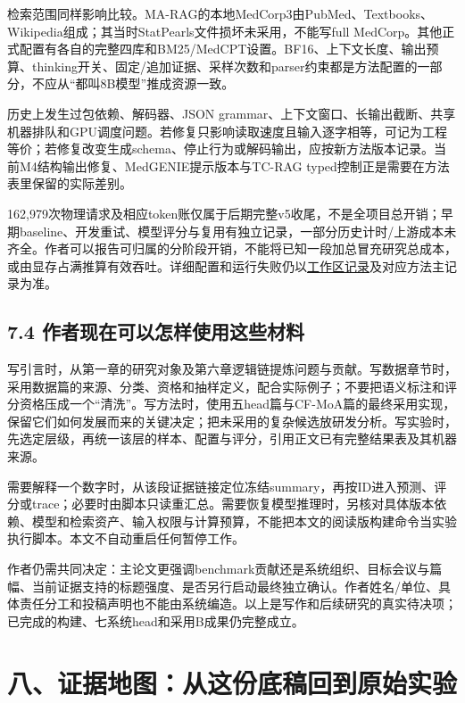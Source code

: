 \documentclass[
  11pt,
  a4paper,
]{article}
\begin{document}
检索范围同样影响比较。MA-RAG的本地MedCorp3由PubMed、Textbooks、Wikipedia组成；其当时StatPearls文件损坏未采用，不能写full
MedCorp。其他正式配置有各自的完整四库和BM25/MedCPT设置。BF16、上下文长度、输出预算、thinking开关、固定/追加证据、采样次数和parser约束都是方法配置的一部分，不应从``都叫8B模型''推成资源一致。

历史上发生过包依赖、解码器、JSON
grammar、上下文窗口、长输出截断、共享机器排队和GPU调度问题。若修复只影响读取速度且输入逐字相等，可记为工程等价；若修复改变生成schema、停止行为或解码输出，应按新方法版本记录。当前M4结构输出修复、MedGENIE提示版本与TC-RAG
typed控制正是需要在方法表里保留的实际差别。

162,979次物理请求及相应token账仅属于后期完整v5收尾，不是全项目总开销；早期baseline、开发重试、模型评分与复用有独立记录，一部分历史计时/上游成本未齐全。作者可以报告可归属的分阶段开销，不能将已知一段加总冒充研究总成本，或由显存占满推算有效吞吐。详细配置和运行失败仍以\href{https://github.com/xiotakut/cf_mrg/blob/main/papers/2026-10-02_cf_moa/author_dossier/records/workspace.md}{工作区记录}及对应方法主记录为准。

\subsection{7.4
作者现在可以怎样使用这些材料}\label{ux4f5cux8005ux73b0ux5728ux53efux4ee5ux600eux6837ux4f7fux7528ux8fd9ux4e9bux6750ux6599}

写引言时，从第一章的研究对象及第六章逻辑链提炼问题与贡献。写数据章节时，采用数据篇的来源、分类、资格和抽样定义，配合实际例子；不要把语义标注和评分资格压成一个``清洗''。写方法时，使用五head篇与CF-MoA篇的最终采用实现，保留它们如何发展而来的关键决定；把未采用的复杂候选放研发分析。写实验时，先选定层级，再统一该层的样本、配置与评分，引用正文已有完整结果表及其机器来源。

需要解释一个数字时，从该段证据链接定位冻结summary，再按ID进入预测、评分或trace；必要时由脚本只读重汇总。需要恢复模型推理时，另核对具体版本依赖、模型和检索资产、输入权限与计算预算，不能把本文的阅读版构建命令当实验执行脚本。本文不自动重启任何暂停工作。

作者仍需共同决定：主论文更强调benchmark贡献还是系统组织、目标会议与篇幅、当前证据支持的标题强度、是否另行启动最终独立确认。作者姓名/单位、具体责任分工和投稿声明也不能由系统编造。以上是写作和后续研究的真实待决项；已完成的构建、七系统head和采用B成果仍完整成立。

\label{evidence-map}

\section{八、证据地图：从这份底稿回到原始实验}\label{ux516bux8bc1ux636eux5730ux56feux4eceux8fd9ux4efdux5e95ux7a3fux56deux5230ux539fux59cbux5b9eux9a8c}
\end{document}
